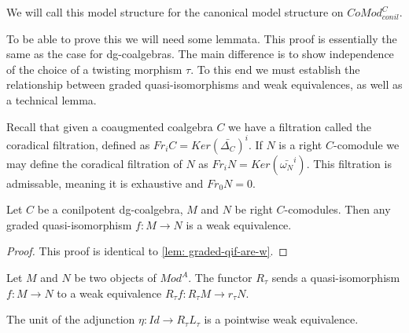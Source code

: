 \documentclass[../thesis.tex]{subfiles}
\begin{document}
            We will call this model structure for the canonical model structure on $CoMod^C_{conil}$.

            To be able to prove this we will need some lemmata. This proof is essentially the same as the case for dg-coalgebras. The main difference is to show independence of the choice of a twisting morphism $\tau$. To this end we must establish the relationship between graded quasi-isomorphisms and weak equivalences, as well as a technical lemma.

            Recall that given a coaugmented coalgebra $C$ we have a filtration called the coradical filtration, defined as $Fr_iC = Ker(\bar{\Delta_C})^i$. If $N$ is a right $C$-comodule we may define the coradical filtration of $N$ as $Fr_iN = Ker(\bar{\omega_N}^i)$. This filtration is admissable, meaning it is exhaustive and $Fr_0N=0$.

            \begin{lemma}
                Let $C$ be a conilpotent dg-coalgebra, $M$ and $N$ be right $C$-comodules. Then any graded quasi-isomorphism $f: M \rightarrow N$ is a weak equivalence.
            \end{lemma}

            \begin{proof}
                This proof is identical to \ref{lem: graded-qif-are-w}.   
            \end{proof}

            \begin{lemma}
                Let $M$ and $N$ be two objects of $Mod^A$. The functor $R_\tau$ sends a quasi-isomorphism $f: M \rightarrow N$ to a weak equivalence $R_\tau f: R_\tau M \rightarrow r_\tau N$.

                The unit of the adjunction $\eta : Id \rightarrow R_\tau L_\tau$ is a pointwise weak equivalence.
            \end{lemma}
\end{document}
